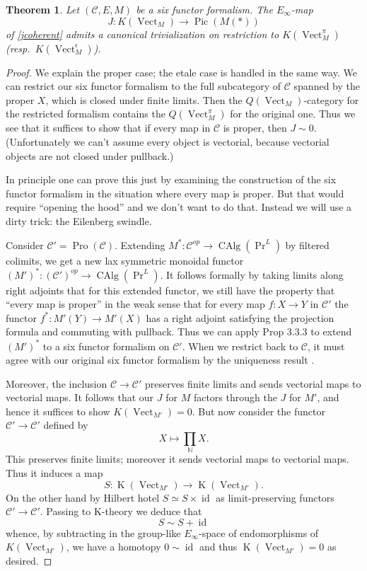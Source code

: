 \documentclass[12pt]{article}
\newtheorem{theorem}{Theorem}[section]
\newcommand{\on}{\operatorname}
\newcommand{\mc}{\mathcal}
\newcommand{\mbb}{\mathbb}
\begin{document}
\begin{theorem}\label{eilenberg}
Let $(\mc{C},E,M)$ be a six functor formalism.  The $E_\infty$-map
$$J:K(\on{Vect}_M)\to \on{Pic}(M(\ast))$$
of \ref{jcoherent} admits a canonical trivialization on restriction to $K(\on{Vect}^\pi_M)$ (resp.\ $K(\on{Vect}^\epsilon_M)$).
\end{theorem}
\begin{proof}
We explain the proper case; the etale case is handled in the same way.  We can restrict our six functor formalism to the full subcategory of $\mathcal{C}$ spanned by the proper $X$, which is closed under finite limits.  Then the $Q(\on{Vect}_M)$-category for the restricted formalism contains the $Q(\on{Vect}_M^\pi)$ for the original one.  Thus we see that it suffices to show that if every map in $\mc{C}$ is proper, then $J\sim 0$.  (Unfortunately we can't assume every object is vectorial, because vectorial objects are not closed under pullback.)

In principle one can prove this just by examining the construction of the six functor formalism in the situation where every map is proper.  But that would require ``opening the hood'' and we don't want to do that.  Instead we will use a dirty trick: the Eilenberg swindle.

Consider $\mc{C}'=\on{Pro}(\mc{C})$.  Extending $M^\ast:\mc{C}^{op} \to \on{CAlg}(\on{Pr}^L)$ by filtered colimits, we get a new lax symmetric monoidal functor $(M')^\ast:(\mc{C}')^{op}\to\on{CAlg}(\on{Pr}^L)$.  It follows formally by taking limits along right adjoints that for this extended functor, we still have the property that ``every map is proper'' in the weak sense that for every map $f:X\to Y$ in $\mc{C}'$ the functor $f^\ast:M'(Y)\to M'(X)$ has a right adjoint satisfying the projection formula and commuting with pullback.  Thus we can apply \cite{HeyerSixFunctors} Prop 3.3.3 to extend $(M')^\ast$ to a six functor formalism on $\mc{C}'$.  When we restrict back to $\mc{C}$, it must agree with our original six functor formalism by the uniqueness result \cite{DauserUniqueness}.

Moreover, the inclusion $\mc{C}\to\mc{C}'$ preserves finite limits and sends vectorial maps to vectorial maps.  It follows that our $J$ for $M$ factors through the $J$ for $M'$, and hence it suffices to show $K(\on{Vect}_{M'})=0$.  But now consider the functor $\mc{C}'\to\mc{C}'$ defined by
$$X\mapsto \prod_\mbb{N} X.$$
This preserves finite limits; moreover it sends vectorial maps to vectorial maps.  Thus it induces a map
$$S:\on{K}(\on{Vect}_{M'})\to \on{K}(\on{Vect}_{M'}).$$
On the other hand by Hilbert hotel $S \simeq S\times \on{id}$ as limit-preserving functors $\mc{C}'\to\mc{C}'$.  Passing to K-theory we deduce that
$$S \sim S + \on{id}$$
whence, by subtracting in the group-like $E_\infty$-space of endomorphisms of $K(\on{Vect}_{M'})$, we have a homotopy $0\sim \on{id}$ and thus $\on{K}(\on{Vect}_{M'})=0$ as desired.
\end{proof}
\end{document}

